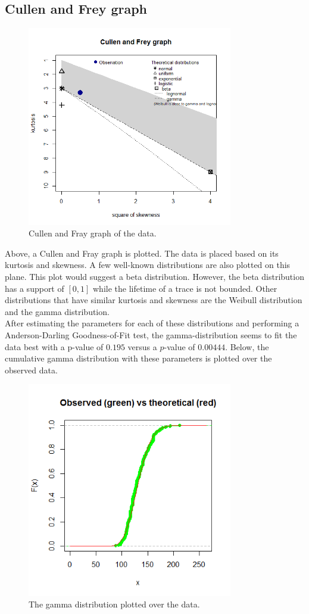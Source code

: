 \subsection{Cullen and Frey graph}
\begin{figure}[H]
\centering
\includegraphics[width=0.8\textwidth]{Plots/CullenAndFray.png}
\caption{Cullen and Fray graph of the data.}
\end{figure}
Above, a Cullen and Fray graph is plotted. The data is placed based on its kurtosis and skewness. A few well-known distributions are also plotted on this plane. This plot would suggest a beta distribution. However, the beta distribution has a support of $[0,1]$ while the lifetime of a trace is not bounded. Other distributions that have similar kurtosis and skewness are the Weibull distribution and the gamma distribution.\\
After estimating the parameters for each of these distributions and performing a Anderson-Darling Goodness-of-Fit test, the gamma-distribution seems to fit the data best with a p-value of $0.195$ versus a $p$-value of $0.00444$. Below, the cumulative gamma distribution with these parameters is plotted over the observed data.
\begin{figure}[H]
\centering
\includegraphics[width=0.8\textwidth]{Plots/GammaCDF.png}
\caption{The gamma distribution plotted over the data.}
\end{figure}




